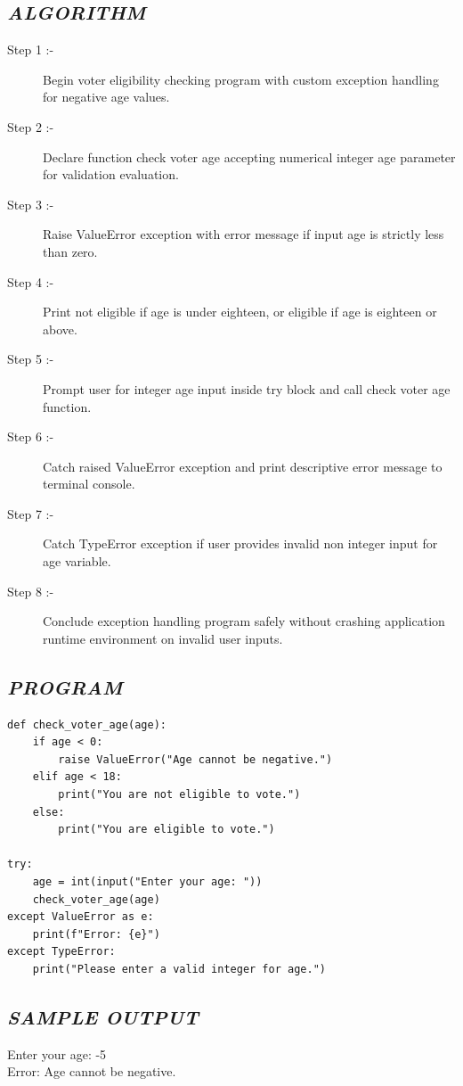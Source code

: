 \documentclass[11pt,a4paper]{article}
\begin{document}
\subsection*{\textit{ALGORITHM}}
\begin{description}
  \item[Step 1 :-] Begin voter eligibility checking program with custom exception handling for negative age values.
  \item[Step 2 :-] Declare function check voter age accepting numerical integer age parameter for validation evaluation.
  \item[Step 3 :-] Raise ValueError exception with error message if input age is strictly less than zero.
  \item[Step 4 :-] Print not eligible if age is under eighteen, or eligible if age is eighteen or above.
  \item[Step 5 :-] Prompt user for integer age input inside try block and call check voter age function.
  \item[Step 6 :-] Catch raised ValueError exception and print descriptive error message to terminal console.
  \item[Step 7 :-] Catch TypeError exception if user provides invalid non integer input for age variable.
  \item[Step 8 :-] Conclude exception handling program safely without crashing application runtime environment on invalid user inputs.
\end{description}

\subsection*{\textit{PROGRAM}}
\begin{lstlisting}[style=pythonstyle]
def check_voter_age(age): 
    if age < 0: 
        raise ValueError("Age cannot be negative.") 
    elif age < 18: 
        print("You are not eligible to vote.") 
    else: 
        print("You are eligible to vote.") 

try: 
    age = int(input("Enter your age: ")) 
    check_voter_age(age) 
except ValueError as e: 
    print(f"Error: {e}") 
except TypeError: 
    print("Please enter a valid integer for age.")
\end{lstlisting}

\subsection*{\textit{SAMPLE OUTPUT}}
\begin{tcolorbox}[colback=black!85,colframe=navyblue,title=\textbf{Terminal Output},coltitle=white,fonttitle=\bfseries\small]
\small\ttfamily\color{green!30!white}
Enter your age: -5\\
Error: Age cannot be negative.
\end{tcolorbox}
\end{document}
